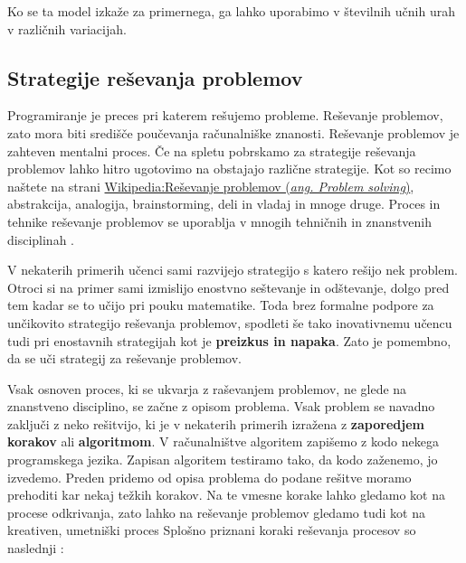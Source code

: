 Ko se ta model izkaže za primernega, ga lahko uporabimo v številnih
učnih urah v različnih variacijah.


\subsection{Strategije reševanja problemov}
\label{sec:strategije_reševanja_problemov}

Programiranje je preces pri katerem rešujemo probleme. Reševanje
problemov, zato mora biti središče poučevanja računalniške
znanosti. Reševanje problemov je zahteven mentalni proces. Če na
spletu pobrskamo za strategije reševanja problemov lahko hitro
ugotovimo na obstajajo različne strategije. Kot so recimo naštete na
strani
\href{https://en.wikipedia.org/wiki/Problem_solving#Problem-solving_strategies}{Wikipedia:Reševanje
  problemov (\emph{ang. Problem solving})}, abstrakcija, analogija,
brainstorming, deli in vladaj in mnoge druge.  Proces in tehnike
reševanje problemov se uporablja v mnogih tehničnih in znanstvenih
disciplinah \cite{guideTCS}.

V nekaterih primerih učenci sami razvijejo strategijo s katero rešijo
nek problem. Otroci si na primer sami izmislijo enostvno seštevanje in
odštevanje, dolgo pred tem kadar se to učijo pri pouku
matematike. Toda brez formalne podpore za unčikovito strategijo
reševanja problemov, spodleti še tako inovativnemu učencu tudi pri
enostavnih strategijah kot je \textbf{preizkus in napaka}. Zato je
pomembno, da se uči strategij za reševanje problemov.


Vsak osnoven proces, ki se ukvarja z raševanjem problemov, ne glede na
znanstveno disciplino, se začne z opisom problema. Vsak problem se
navadno zaključi z neko rešitvijo, ki je v nekaterih primerih izražena
z \textbf{zaporedjem korakov} ali \textbf{algoritmom}. V računalništve
algoritem zapišemo z kodo nekega programskega jezika. Zapisan
algoritem testiramo tako, da kodo zaženemo, jo izvedemo. Preden
pridemo od opisa problema do podane rešitve moramo prehoditi kar nekaj
težkih korakov. Na te vmesne korake lahko gledamo kot na procese
odkrivanja, zato lahko na reševanje problemov gledamo tudi kot na
kreativen, umetniški proces Splošno priznani koraki reševanja procesov
so naslednji \cite{guideTCS}:

